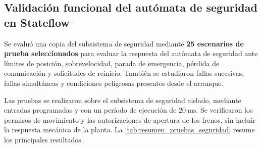 \subsection{Validación funcional del autómata de seguridad en Stateflow}
\label{sec:validacion_seguridad_stateflow}
Se evaluó una copia del subsistema de seguridad mediante \textbf{25 escenarios de prueba seleccionados} para evaluar la respuesta del autómata de seguridad ante límites de posición, sobrevelocidad, parada de emergencia, pérdida de comunicación y solicitudes de reinicio. También se estudiaron fallas sucesivas, fallas simultáneas y condiciones peligrosas presentes desde el arranque.

Las pruebas se realizaron sobre el subsistema de seguridad aislado, mediante entradas programadas y con un período de ejecución de $20~\mathrm{ms}$. Se verificaron los permisos de movimiento y las autorizaciones de apertura de los frenos, sin incluir la respuesta mecánica de la planta. La \cref{tab:resumen_pruebas_seguridad} resume los principales resultados.

